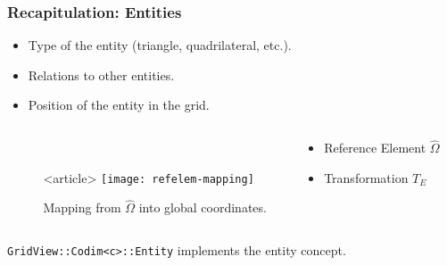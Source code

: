 \begin{frame}
  \frametitle<presentation>{Recapitulation: Entities}

  \begin{itemize}
  \item Type of the entity (triangle, quadrilateral, etc.).
  \item Relations to other entities.
  \end{itemize}
  \begin{itemize}
  \item Position of the entity in the grid.
  \end{itemize}

  \begin{columns}
    \begin{column}{5mm}
    \end{column}
    \begin{column}{0.4\textwidth}
      \begin{center}
        \\
        \begin{onlyenv}<article>
          \texttt{[image: refelem-mapping]}\\
        \end{onlyenv}
        \centerline{\tiny Mapping from $\hat{\Omega}$ into global coordinates.}
      \end{center}
    \end{column}
    \begin{column}{0.5\textwidth}
        \begin{itemize}
        \item Reference Element $\hat{\Omega}$
        \item Transformation $T_E$
        \end{itemize}
    \end{column}
  \end{columns}

  \lstinline!GridView::Codim<c>::Entity!
  implements the entity concept.

\end{frame}

